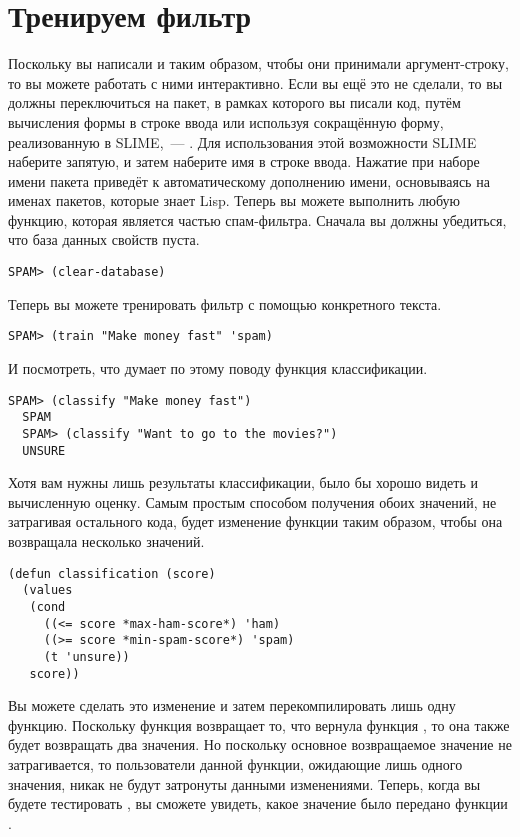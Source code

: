 \section{Тренируем фильтр}

Поскольку вы написали  и  таким образом, чтобы они принимали
аргумент-строку, то вы можете работать с ними интерактивно.  Если вы ещё это не сделали,
то вы должны переключиться на пакет, в рамках которого вы писали код, путём вычисления
формы  в строке ввода или используя сокращённую форму, реализованную в
SLIME,~--- .  Для использования этой возможности SLIME наберите
запятую, и затем наберите имя в строке ввода.  Нажатие  при наборе имени пакета
приведёт к автоматическому дополнению имени, основываясь на именах пакетов, которые знает
Lisp.  Теперь вы можете выполнить любую функцию, которая является частью спам-фильтра.
Сначала вы должны убедиться, что база данных свойств пуста.

\begin{lstlisting}[style=lisprepl]
  SPAM> (clear-database)
\end{lstlisting}

Теперь вы можете тренировать фильтр с помощью конкретного текста.

\begin{lstlisting}[style=lisprepl]
  SPAM> (train "Make money fast" 'spam)
\end{lstlisting}

И посмотреть, что думает по этому поводу функция классификации.

\begin{lstlisting}[style=lisprepl]
  SPAM> (classify "Make money fast")
  SPAM
  SPAM> (classify "Want to go to the movies?")
  UNSURE
\end{lstlisting}

Хотя вам нужны лишь результаты классификации, было бы хорошо видеть и вычисленную оценку.
Самым простым способом получения обоих значений, не затрагивая остального кода, будет
изменение функции  таким образом, чтобы она возвращала несколько
значений.

\begin{lstlisting}
(defun classification (score)
  (values
   (cond
     ((<= score *max-ham-score*) 'ham)
     ((>= score *min-spam-score*) 'spam)
     (t 'unsure))
   score))
\end{lstlisting}

Вы можете сделать это изменение и затем перекомпилировать лишь одну функцию.  Поскольку
функция  возвращает то, что вернула функция , то она
также будет возвращать два значения.  Но поскольку основное возвращаемое значение не
затрагивается, то пользователи данной функции, ожидающие лишь одного значения, никак не
будут затронуты данными изменениями.  Теперь, когда вы будете тестировать ,
вы сможете увидеть, какое значение было передано функции .

